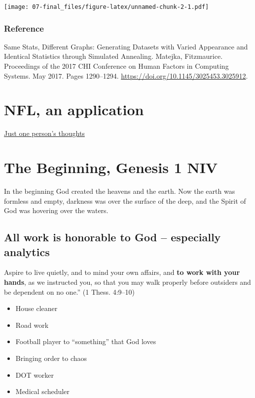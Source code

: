 \documentclass[
]{book}
\providecommand{\tightlist}{%
  \setlength{\itemsep}{0pt}\setlength{\parskip}{0pt}}
\begin{document}
\texttt{[image: 07-final\_files/figure-latex/unnamed-chunk-2-1.pdf]}

\hypertarget{reference}{%
\subsection{Reference}\label{reference}}

Same Stats, Different Graphs: Generating Datasets with Varied Appearance and Identical Statistics through Simulated Annealing. Matejka, Fitzmaurice. Proceedings of the 2017 CHI Conference on Human Factors in Computing Systems. May 2017. Pages 1290--1294. \url{https://doi.org/10.1145/3025453.3025912}.

\hypertarget{nfl-an-application}{%
\chapter{NFL, an application}\label{nfl-an-application}}

\href{https://rpubs.com/afuecker/727520}{Just one person's thoughts}

\hypertarget{the-beginning-genesis-1-niv}{%
\chapter{The Beginning, Genesis 1 NIV}\label{the-beginning-genesis-1-niv}}

In the beginning God created the heavens and the earth. Now the earth was formless and empty, darkness was over the surface of the deep, and the Spirit of God was hovering over the waters.

\hypertarget{all-work-is-honorable-to-god-especially-analytics}{%
\section{\texorpdfstring{All work is honorable to God -- especially \textbf{analytics}}{All work is honorable to God -- especially analytics}}\label{all-work-is-honorable-to-god-especially-analytics}}

Aspire to live quietly, and to mind your own affairs, and \textbf{to work with your hands}, as we instructed you, so that you may walk properly before outsiders and be dependent on no one.'' (1 Thess. 4:9--10)

\begin{itemize}
\tightlist
\item
  House cleaner
\item
  Road work
\item
  Football player to ``something'' that God loves
\item
  Bringing order to chaos
\item
  DOT worker
\item
  Medical scheduler
\end{itemize}
\end{document}
